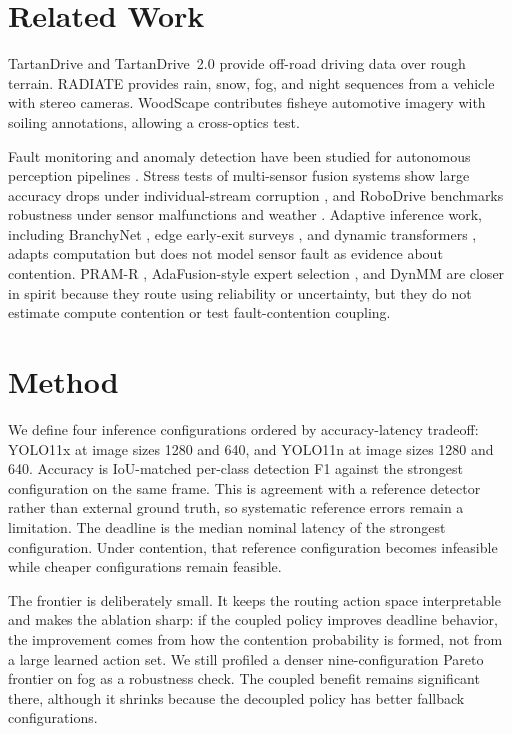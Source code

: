 \documentclass[conference]{IEEEtran}
\begin{document}
\section{Related Work}
\label{sec:related}

TartanDrive \cite{triest2022tartandrive} and TartanDrive~2.0
\cite{sivaprakasam2024tartandrive2} provide off-road driving data
over rough terrain. RADIATE \cite{sheeny2021radiate} provides rain,
snow, fog, and night sequences from a vehicle with stereo cameras.
WoodScape \cite{yogamani2019woodscape} contributes fisheye
automotive imagery with soiling annotations, allowing a cross-optics
test.

Fault monitoring and anomaly detection have been studied for
autonomous perception pipelines
\cite{antonante2022monitoring,bogdoll2022anomaly,hou2023fault}.
Stress tests of multi-sensor fusion systems show large accuracy
drops under individual-stream corruption \cite{tian2025fault}, and
RoboDrive benchmarks robustness under sensor malfunctions and
weather \cite{robodrive2024}. Adaptive inference work, including
BranchyNet \cite{teerapittayanon2016branchynet}, edge early-exit
surveys \cite{laskaridis2021adaptive}, and dynamic transformers
\cite{wang2021notallimages}, adapts computation but does not model
sensor fault as evidence about contention. PRAM-R \cite{pramr2025},
AdaFusion-style expert selection \cite{mees2016choosing}, and DynMM
\cite{dynmm} are closer in spirit because they route using
reliability or uncertainty, but they do not estimate compute
contention or test fault-contention coupling.

\section{Method}
\label{sec:method}

We define four inference configurations ordered by accuracy-latency
tradeoff: YOLO11x at image sizes 1280 and 640, and YOLO11n at image
sizes 1280 and 640. Accuracy is IoU-matched per-class detection F1
against the strongest configuration on the same frame. This is
agreement with a reference detector rather than external ground
truth, so systematic reference errors remain a limitation. The
deadline is the median nominal latency of the strongest
configuration. Under contention, that reference configuration becomes
infeasible while cheaper configurations remain feasible.

The frontier is deliberately small. It keeps the routing action space
interpretable and makes the ablation sharp: if the coupled policy
improves deadline behavior, the improvement comes from how the
contention probability is formed, not from a large learned action set.
We still profiled a denser nine-configuration Pareto frontier on fog
as a robustness check. The coupled benefit remains significant there,
although it shrinks because the decoupled policy has better fallback
configurations.
\end{document}
